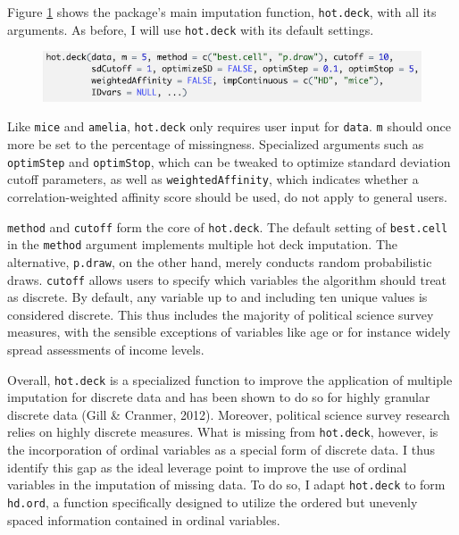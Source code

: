 \documentclass[12pt,econ]{sources/authesis}
\makeatletter
\def\maxwidth{\ifdim\Gin@nat@width>\linewidth\linewidth
\else\Gin@nat@width\fi}
\let\Oldincludegraphics\includegraphics
\renewcommand{\includegraphics}[1]{\Oldincludegraphics[width=\maxwidth]{#1}}
\def\caption{\refstepcounter\@captype \@dblarg{\@caption\@captype}}
\makeatother
\begin{document}
Figure \ref{hot.deck-func} shows the package's main imputation function, \texttt{hot.deck}, with all its arguments. As before, I will use \texttt{hot.deck} with its default settings.
\begin{figure}[hbt]
  \centering
  \includegraphics{figures/hot.deck.png}
  \caption{The \texttt{hot.deck} function}
  \label{hot.deck-func}
\end{figure}
Like \texttt{mice} and \texttt{amelia}, \texttt{hot.deck} only requires user input for \texttt{data}. \texttt{m} should once more be set to the percentage of missingness. Specialized arguments such as \texttt{optimStep} and \texttt{optimStop}, which can be tweaked to optimize standard deviation cutoff parameters, as well as \texttt{weightedAffinity}, which indicates whether a correlation-weighted affinity score should be used, do not apply to general users.

\texttt{method} and \texttt{cutoff} form the core of \texttt{hot.deck}. The default setting of \texttt{best.cell} in the \texttt{method} argument implements multiple hot deck imputation. The alternative, \texttt{p.draw}, on the other hand, merely conducts random probabilistic draws. \texttt{cutoff} allows users to specify which variables the algorithm should treat as discrete. By default, any variable up to and including ten unique values is considered discrete. This thus includes the majority of political science survey measures, with the sensible exceptions of variables like age or for instance widely spread assessments of income levels.

Overall, \texttt{hot.deck} is a specialized function to improve the application of multiple imputation for discrete data and has been shown to do so for highly granular discrete data (Gill \& Cranmer, 2012). Moreover, political science survey research relies on highly discrete measures. What is missing from \texttt{hot.deck}, however, is the incorporation of ordinal variables as a special form of discrete data. I thus identify this gap as the ideal leverage point to improve the use of ordinal variables in the imputation of missing data. To do so, I adapt \texttt{hot.deck} to form \texttt{hd.ord}, a function specifically designed to utilize the ordered but unevenly spaced information contained in ordinal variables.
\end{document}
